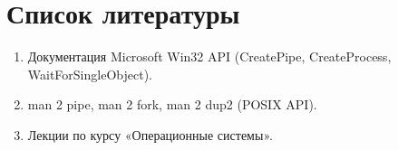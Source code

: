 \section*{Список литературы}
\begin{enumerate}
    \item Документация Microsoft Win32 API (CreatePipe, CreateProcess, WaitForSingleObject).
    \item man 2 pipe, man 2 fork, man 2 dup2 (POSIX API).
    \item Лекции по курсу «Операционные системы».
\end{enumerate}